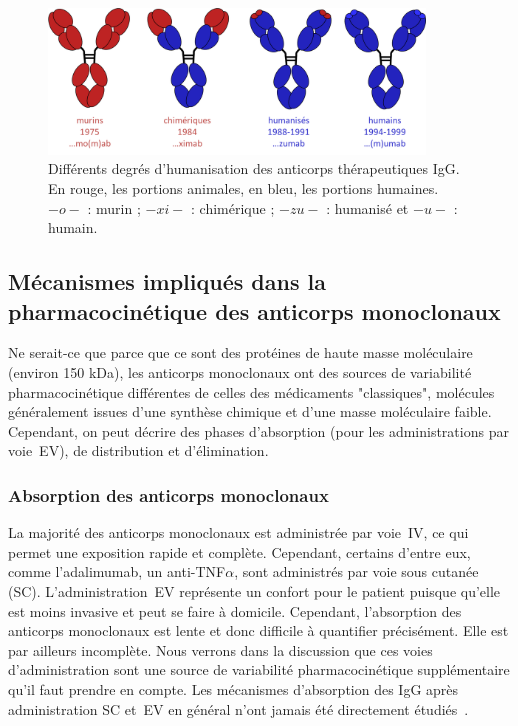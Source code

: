 \begin{figure}[htbp]
	\centering
		\includegraphics[width=10cm]{figures/raster/FIG_12}
	\caption[Différents degrés d'humanisation des anticorps thérapeutiques IgG.]{Différents degrés d'humanisation des anticorps thérapeutiques IgG. En rouge, les portions animales, en bleu, les portions humaines. $-o-$ : murin ; $-xi-$ : chimérique ; $-zu-$ : humanisé et $-u-$ : humain.}
	\label{fig:12}
\end{figure}

\subsection{Mécanismes impliqués dans la pharmacocinétique des anticorps monoclonaux}
Ne serait-ce que parce que ce sont des protéines de haute masse moléculaire (environ 150 kDa), les anticorps monoclonaux ont des sources de variabilité pharmacocinétique différentes de celles des médicaments "classiques", molécules généralement issues d'une synthèse chimique et d'une masse moléculaire faible. Cependant, on peut décrire des phases d'absorption (pour les administrations par voie~EV), de distribution et d'élimination.

\subsubsection{Absorption des anticorps monoclonaux}
La majorité des anticorps monoclonaux est administrée par voie~IV, ce qui permet une exposition rapide et complète. Cependant, certains d'entre eux, comme l'adalimumab, un anti-TNF$\alpha$, sont administrés par voie sous cutanée (SC). L'administration~EV représente un confort pour le patient puisque qu'elle est moins invasive et peut se faire à domicile. Cependant, l'absorption des anticorps monoclonaux est lente et donc difficile à quantifier précisément. Elle est par ailleurs incomplète. Nous verrons dans la discussion que ces voies d'administration sont une source de variabilité pharmacocinétique supplémentaire qu'il faut prendre en compte. Les mécanismes d'absorption des IgG après administration SC et~EV en général n'ont jamais été directement étudiés~\citep{REF18}. 

